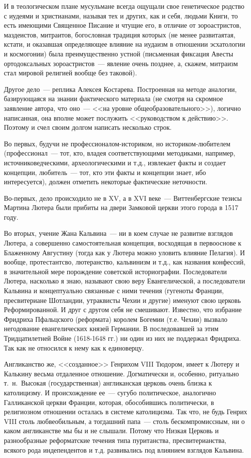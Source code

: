 И в теологическом плане мусульмане всегда ощущали свое генетическое родство с иудеями и христианами, называя тех и других, как и себя, людьми Книги, то есть имеющими Священное Писание и чтущие его, в отличие от зороастристов, маздеистов, митраитов, богословная традиция которых (не менее развитаятая, кстати, и оказавшая определяющее влияние на иудаизм в отношении эсхатологии и космогонии) была преимущественно устной (письменная фиксация Авесты ортодоксальных зороастристов~--- явление очень позднее, а, скажем, митраизм стал мировой религией вообще без таковой). 

Другое дело~--- реплика Алексея Костарева. Построенная на методе аналогии, базирующаяся на знании фактического материала (не смотря на скромное заявление автора, что оно~--- <<на уровне общеобразовательного>>), логично написанная, она вполне может послужить <<руководством к действию>>. Поэтому и счел своим долгом написать несколько строк. 

Во первых, будучи не профессионалом-историком, но историком-любителем (профессионал~--- тот, кто, владея соответствующими методиками, например, источниковедческими, археологическими и т.д., извлекает факты и создает концепции, любитель~--- тот, кто эти факты и концепции знает, ибо интересуется), должен отметить некоторые фактические неточности.

Во-первых, дело происходило не в XV, а в XVI веке~--- Виттенбергские тезисы Мартина Лютера были прибиты на двери Замковой церкви этого города в 1517 году.

Во вторых, учение Жана Кальвина~--- ни в коем случае не развитие взглядов Лютера, а совершенно самостоятельная концепция, восходящая в первооснове к Блаженному Августину (тогда как у Лютера можно уловить влияние Пелагия). И вообще, протестантсво, лютеранство, кальвинизм и т.д., как названия конфессий, в значительной мере порождение советской историографии. Последователи Лютера, насколько я знаю, называют свою веру Евангелической, а последователи Кальвина и концептуально связанные с ними течения (гугеноты Франции, пресвитериане Шотландии, утраквисты Чехии и другие) именуют свою церковь Реформированной. И друг с другом себя не смешивают. Известно, что избрание Фридриха Пфальцского (реформата) королем Богемии (т.е. Чехии) вызвало негодование евангелических князей Германии. В последовавшей за этим Тридцатилетней Войне (1618-1648 гг.) ни один из них не поддержал Фридриха. Так как не относился к нему как к единоверцу. 

Англиканство же, <<созданное>> Генрихом VIII Тюдором, имеет к Лютеру и Калькину весьма отдаленное отношение. Догматически и, особенно, ритуально т.~н.~Высокая (государственная) англиканская церковь очень близка к католицизму. И происхождение ее~--- сугубо политическое, аналогично Галликанской церкви Франции, которая, обособившись политически, в религиозном отношении осталась в системе католицизма. Так что, не будь Генрих VIII столь любвеобильным, а тогдашний папа~--- столь бескомпромиссным, ни о каком англиканстве мы бы и не слышали. Потому что Низкая Церковь и разнообразные реформатские течения типа пуританства, пресвитерианства, всякого рода индепендентов и т.д. развивались под влиянием взглядов Кальвина. 

